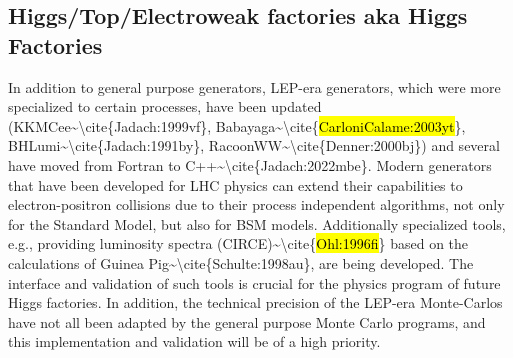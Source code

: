 \subsection{Higgs/Top/Electroweak factories aka Higgs
Factories}\label{higgstopelectroweak-factories-aka-higgs-factories}

In addition to general purpose generators, LEP-era generators, which
were more specialized to certain processes, have been updated
(KKMCee\textasciitilde\textbackslash cite\{Jadach:1999vf\},
Babayaga\textasciitilde\textbackslash cite\{\hl{CarloniCalame:2003yt}\},
BHLumi\textasciitilde\textbackslash cite\{Jadach:1991by\},
RacoonWW\textasciitilde\textbackslash cite\{Denner:2000bj\}) and several
have moved from Fortran to
C++\textasciitilde\textbackslash cite\{Jadach:2022mbe\}. Modern
generators that have been developed for LHC physics can extend their
capabilities to electron-positron collisions due to their process
independent algorithms, not only for the Standard Model, but also for
BSM models. Additionally specialized tools, e.g., providing luminosity
spectra (CIRCE)\textasciitilde\textbackslash cite\{\hl{Ohl:1996fi}\}
based on the calculations of Guinea
Pig\textasciitilde\textbackslash cite\{Schulte:1998au\}, are being
developed. The interface and validation of such tools is crucial for the
physics program of future Higgs factories. In addition, the technical
precision of the LEP-era Monte-Carlo\textquotesingle s have not all been
adapted by the general purpose Monte Carlo programs, and this
implementation and validation will be of a high priority.

